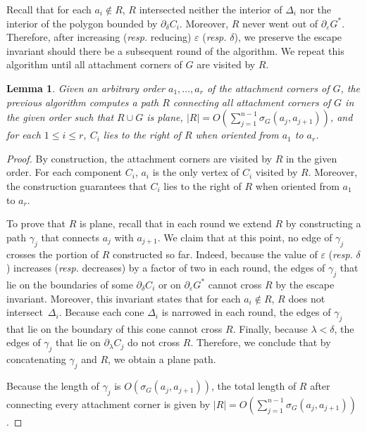 \documentclass[a4paper, 11pt]{article}
\newtheorem{lemma}[theorem]{Lemma}
\begin{document}
Recall that for each $a_i\notin R$, $R$ intersected neither the interior of $\Delta_i$ nor the interior of the polygon bounded by $\partial_\delta C_i$. Moreover, $R$ never went out of $\partial_\varepsilon G^*$.
Therefore, after increasing (\emph{resp.} reducing) $\varepsilon$ (\emph{resp.} $\delta$), we preserve the escape invariant should there be a subsequent round of the algorithm.
We repeat this algorithm until all attachment corners of $G$ are visited by $R$.

\begin{lemma}\label{lemma:Path for connected augmentations}
Given an arbitrary order $a_1, \ldots, a_r$ of the attachment corners of $G$, the previous algorithm computes a path $R$ connecting all attachment corners of $G$ in the given order such that $R\cup G$ is plane, $|R| = O(\sum_{j=1}^{n-1} \sigma_G(a_j, a_{j+1}))$, and for each $1\leq i\leq r$, $C_i$ lies to the right of $R$ when oriented from $a_1$ to $a_r$.
\end{lemma}
\begin{proof}
By construction, the attachment corners are visited by $R$ in the given order. For each component $C_i$, $a_i$ is the only vertex of $C_i$ visited by $R$. Moreover, the construction guarantees that $C_i$ lies to the right of $R$ when oriented from $a_1$ to $a_r$.

To prove that $R$ is plane, recall that in each round we extend $R$ by constructing  a path $\gamma_j$ that connects $a_j$ with $a_{j+1}$. We claim that at this point, no edge of $\gamma_j$ crosses the portion of $R$ constructed so far.
Indeed, because the value of $\varepsilon$ (\emph{resp.} $\delta$) increases (\emph{resp.} decreases) by a factor of two in each round, the edges of $\gamma_j$ that lie on the boundaries of some $\partial_\delta C_i$ or on $\partial_\varepsilon G^*$ cannot cross $R$ by the escape invariant.
Moreover, this invariant states that for each $a_i\notin R$, $R$ does not intersect~$\Delta_i$.
Because each cone $\Delta_i$ is narrowed in each round, the edges of $\gamma_j$ that lie on the boundary of this cone cannot cross $R$. Finally, because $\lambda < \delta$, the edges of $\gamma_j$ that lie on $\partial_\lambda C_j$ do not cross $R$. Therefore, we conclude that by concatenating $\gamma_j$ and $R$, we obtain a plane path.

Because the length of $\gamma_j$ is $O(\sigma_G(a_j, a_{j+1}))$, the total length of $R$ after connecting every attachment corner is given by $|R| = O(\sum_{j=1}^{n-1} \sigma_G(a_j, a_{j+1}))$.
\end{proof}
\end{document}
